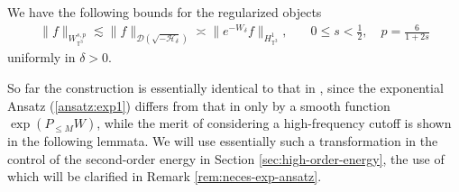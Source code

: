 \begin{cor}
  \label{cor:uniformdelta}We have the following bounds
  for the regularized objects
  \begin{align*}
    \| f \|_{W_{\mathbb{T}^3}^{s, p}} \lesssim \| f \|_{\mathcal{D} \left(
    \sqrt{-\mathcal{H}_{\delta}} \right)} \asymp \| e^{- W_{\delta}}
    f \|_{H_{\mathbb{T}^3}^1}, \quad & 0 \leqslant s < \frac{1}{2}, \quad p = \frac{6}{1 + 2
    s}
  \end{align*}
  uniformly in $\delta > 0$.
\end{cor}

So far the construction is essentially identical to that in {\cite{GUZ20}},
since the exponential Ansatz (\ref{ansatz:exp1}) differs from that in
{\cite{GUZ20}} only by a smooth function $\exp (P_{\leqslant M} W)$, while the
merit of considering a high-frequency cutoff is shown in the following
lemmata. We will use essentially such a transformation in the control of the
second-order energy in Section \ref{sec:high-order-energy}, the use of which
will be clarified in Remark \ref{rem:neces-exp-ansatz}.

